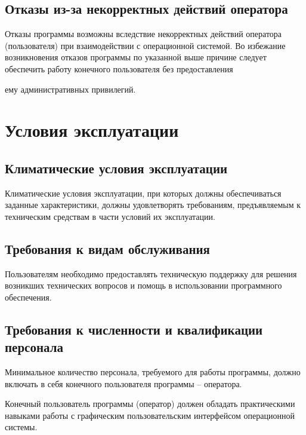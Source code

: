 \documentclass[14pt,a4paper,final]{extreport}
\begin{document}
\pagebreak %
\fancyhead[C]{\bfseries\thepage\\\docstamp}  %

\subsection{Отказы из-за некорректных действий оператора}
Отказы программы возможны вследствие некорректных действий оператора (пользователя) при взаимодействии с операционной системой. Во избежание возникновения отказов программы по указанной выше причине следует обеспечить работу конечного пользователя без предоставления

ему административных привилегий.

\section{Условия эксплуатации}

\subsection{Климатические условия эксплуатации}
Климатические условия эксплуатации, при которых должны обеспечиваться заданные характеристики, должны удовлетворять требованиям, предъявляемым к техническим средствам в части условий их эксплуатации.

\subsection{Требования к видам обслуживания}
Пользователям необходимо предоставлять техническую поддержку для решения возникших технических вопросов и помощь в использовании программного обеспечения.

\subsection{Требования к численности и квалификации персонала}
Минимальное количество персонала, требуемого для работы программы, должно включать в себя конечного пользователя программы -- оператора.

Конечный пользователь программы (оператор) должен обладать практическими навыками работы с графическим пользовательским интерфейсом операционной системы.

\pagebreak %
\end{document}
